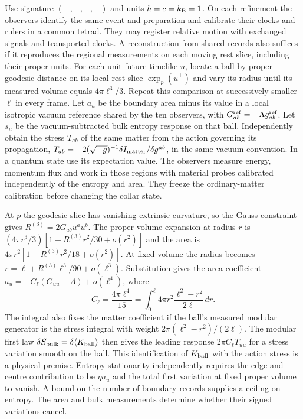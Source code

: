 \documentclass[11pt]{article}
\theoremstyle{definition}
\theoremstyle{remark}
\begin{document}
Use signature $(-,+,+,+)$ and units $\hbar=c=k_{\rm B}=1$. On each refinement
the observers identify the same event and preparation and calibrate their
clocks and rulers in a common tetrad. They may register relative motion
with exchanged signals and transported clocks. A reconstruction from
shared records also suffices if it reproduces the regional measurements
on each moving rest slice, including their proper units. For each unit
future timelike $u$, locate a ball by
proper geodesic distance on its local rest slice $\exp_p(u^\perp)$ and vary
its radius until its measured volume equals $4\pi\ell^3/3$. Repeat this
comparison at successively smaller $\ell$ in every frame. Let $a_u$ be
the boundary area minus its value in a local isotropic vacuum reference
shared by the ten observers, with
$G^{\rm ref}_{ab}=-\Lambda g^{\rm ref}_{ab}$. Let $s_u$ be the vacuum-subtracted
bulk entropy response on that ball. Independently obtain the stress $T_{ab}$
of the same matter from the action governing its propagation,
$T_{ab}=-2(\sqrt{-g})^{-1}\delta I_{\rm matter}/\delta g^{ab}$, in the same
vacuum convention. In a quantum state use its expectation value. The
observers measure energy, momentum flux and work in those regions with
material probes calibrated independently of the entropy and area. They
freeze the ordinary-matter calibration before changing the collar state.

At $p$ the geodesic slice has vanishing extrinsic curvature, so the Gauss
constraint gives $R^{(3)}=2G_{ab}u^au^b$. The proper-volume expansion at
radius $r$ is $(4\pi r^3/3)[1-R^{(3)}r^2/30+o(r^2)]$ and the area is
$4\pi r^2[1-R^{(3)}r^2/18+o(r^2)]$. At fixed volume the radius becomes
$r=\ell+R^{(3)}\ell^3/90+o(\ell^3)$. Substitution gives the area
coefficient $a_u=-C_\ell(G_{uu}-\Lambda)+o(\ell^4)$, where
\[
 C_\ell=\frac{4\pi\ell^4}{15}
       =\int_0^\ell 4\pi r^2\frac{\ell^2-r^2}{2\ell}\,dr .
\]
The integral also fixes the matter coefficient if the ball's measured
modular generator is the stress integral with weight
$2\pi(\ell^2-r^2)/(2\ell)$. The modular first law
$\delta S_{\rm bulk}=\delta\langle K_{\rm ball}\rangle$ then gives the
leading response $2\pi C_\ell T_{uu}$ for a stress variation smooth on
the ball. This identification of $K_{\rm ball}$ with the action stress
is a physical premise. Entropy stationarity independently requires the
edge and centre contribution to be $\eta a_u$ and the total first
variation at fixed proper volume to vanish. A bound on the number of
boundary records supplies a ceiling on entropy. The area and bulk
measurements determine whether their signed variations cancel.
\end{document}
